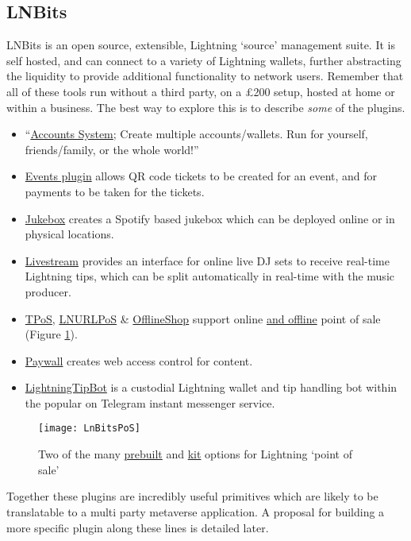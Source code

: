 \subsection{LNBits}
LNBits is an open source, extensible, Lightning `source' management suite. It is self hosted, and can connect to a variety of Lightning wallets, further abstracting the liquidity to provide additional functionality to network users. Remember that all of these tools run without a third party, on a £200 setup, hosted at home or within a business. The best way to explore this is to describe \textit{some} of the plugins. 
\begin{itemize}
\item ``\href{https://github.com/lnbits/lnbits-legend#lnbits-v03-beta-free-and-open-source-lightning-network-walletaccounts-system}{Accounts System}; Create multiple accounts/wallets. Run for yourself, friends/family, or the whole world!''
\item \href{https://github.com/lnbits/lnbits-legend/tree/quart/lnbits/extensions/events#events}{Events plugin} allows QR code tickets to be created for an event, and for payments to be taken for the tickets.
\item \href{https://github.com/lnbits/lnbits-legend/tree/quart/lnbits/extensions/jukebox#jukebox}{Jukebox} creates a Spotify based jukebox which can be deployed online or in physical locations.
\item \href{https://github.com/lnbits/lnbits-legend/tree/quart/lnbits/extensions/livestream#dj-livestream}{Livestream} provides an interface for online live DJ sets to receive real-time Lightning tips, which can be split automatically in real-time with the music producer.
\item \href{https://github.com/lnbits/lnbits-legend/tree/quart/lnbits/extensions/tpos#tpos}{TPoS}, \href{https://github.com/arcbtc/LNURLPoS#lnurlpos}{LNURLPoS} \& \href{https://github.com/lnbits/lnbits-legend/tree/quart/lnbits/extensions/watchonly#watch-only-wallet}{OfflineShop} support online \href{https://rapaygo.com/}{and offline} point of sale (Figure \ref{fig:LnBitsPoS}).
\item \href{https://github.com/lnbits/lnbits-legend/tree/quart/lnbits/extensions/paywall#paywall}{Paywall} creates web access control for content. 
\item \href{https://github.com/LightningTipBot/LightningTipBot#lightningtipbot-}{LightningTipBot} is a custodial Lightning wallet and tip handling bot within the popular on Telegram instant messenger service.
\end{itemize}
\begin{figure}
  \centering
    \texttt{[image: LnBitsPoS]}
  \caption{Two of the many \href{https://rapaygo.com/}{prebuilt} and \href{https://github.com/arcbtc/LNURLPoS}{kit} options for Lightning `point of sale'}
  \label{fig:LnBitsPoS}
\end{figure}
Together these plugins are incredibly useful primitives which are likely to be translatable to a multi party metaverse application. A proposal for building a more specific plugin along these lines is detailed later.
